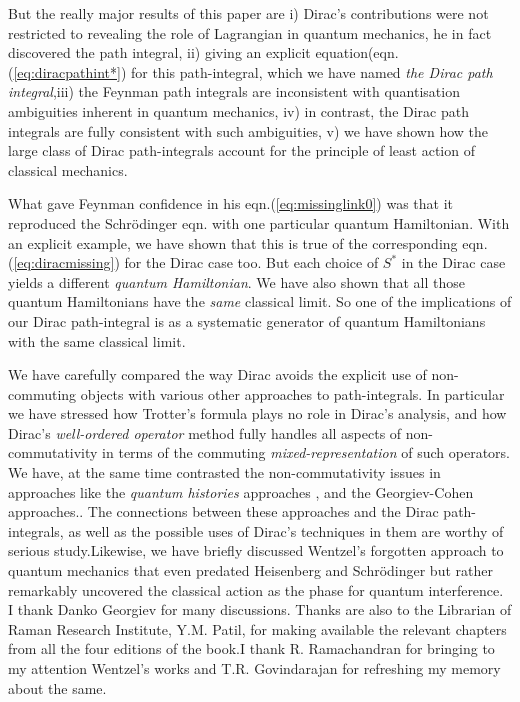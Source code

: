 \documentclass[a4paper]{JHEP3}
\begin{document}
But the really major results of this paper are i) Dirac's contributions were not restricted to revealing the role of Lagrangian in
quantum mechanics, he in fact discovered the path integral, ii) giving an explicit equation(eqn.(\ref{eq:diracpathint*}) for this 
path-integral, which we have named \emph{the Dirac path integral},iii) the Feynman path integrals are inconsistent with quantisation ambiguities
inherent in quantum mechanics, iv) in contrast, the Dirac path integrals are fully consistent with such ambiguities, v) we have shown
how the large class of Dirac path-integrals account for the principle of least action of classical mechanics.

What gave Feynman confidence in his eqn.(\ref{eq:missinglink0}) was that it reproduced the Schr\"odinger eqn. with one particular quantum
Hamiltonian. With an explicit example, we
have shown that this is true of the corresponding eqn.(\ref{eq:diracmissing}) for the Dirac case too. But each choice of $S^*$ in the
Dirac case yields a different \emph{quantum Hamiltonian}. We have also shown that all those quantum Hamiltonians have the \emph{same}
classical limit. So one of the implications of our Dirac path-integral is as a systematic generator of quantum Hamiltonians with the
same classical limit.

We have carefully compared the way Dirac avoids the explicit use of non-commuting objects with various other approaches to path-integrals.
In particular we have stressed how Trotter's formula plays no role in Dirac's analysis, and how Dirac's \emph{well-ordered operator} method
fully handles all aspects of non-commutativity in terms of the commuting \emph{mixed-representation} of such operators. We have, at the same 
time contrasted the non-commutativity issues in approaches like the \emph{quantum histories} approaches \cite{griffiths}, and the 
Georgiev-Cohen \cite{histories} approaches.. The connections between these
approaches and the Dirac path-integrals, as well as the possible uses of Dirac's techniques in them are worthy of serious study.Likewise, we
have briefly discussed Wentzel's forgotten approach to quantum mechanics that even predated Heisenberg and Schr\"odinger but rather
remarkably uncovered the classical action as the phase for quantum interference. 
\acknowledgments I thank Danko Georgiev for many discussions.
Thanks are also to the Librarian of Raman Research Institute, Y.M. Patil, for making available the relevant
chapters from all the four editions of the book.I thank R. Ramachandran for bringing to my attention Wentzel's works and 
T.R. Govindarajan for refreshing my memory about the same. 
\end{document}
